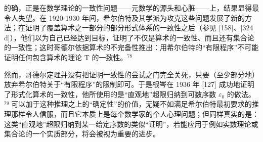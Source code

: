 的确，正是在数学理论的一致性问题——元数学的源头和心脏——上，结果显得最令人失望。在 1920-1930 年间，希尔伯特及其学派为攻克这些问题发展了新的方法；在证明了覆盖算术之一部分的部分形式体系的一致性之后（参见 {[}158{]}、{[}324 d{]}），他们以为自己已经达到目标，证明了不仅是算术的一致性、而且还有集合论的一致性；这时哥德尔依据算术的不完备性推出：用希尔伯特的“有限程序”不可能证明任何包含算术的理论 T 的一致性。\(^{78}\)

然而，哥德尔定理并没有把证明一致性的尝试之门完全关死，只要（至少部分地）放弃希尔伯特关于“有限程序”的限制即可。于是根岑在 1936 年 {[}127{]} 成功地证明了形式化算术的一致性，他所使用的是“直观地”超限归纳到可数序数 \(\varepsilon_{0}\) 的做法。⁷⁹ 可以加于这种推理之上的“确定性”的价值，无疑不如满足希尔伯特最初要求的推理那样令人信服，而且它本质上是每个数学家的个人心理问题；但同样真实的是：这类“直观地”超限归纳到某一给定序数的类似“证明”，若能应用于例如实数理论或集合论的一个实质部分，将会被视为重要的进步。

